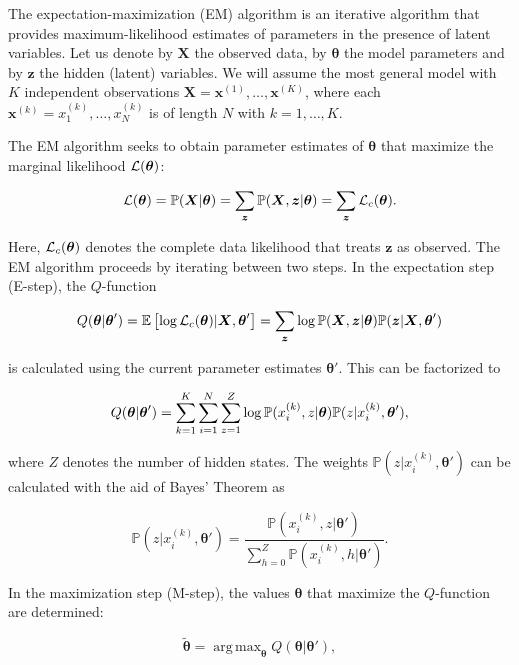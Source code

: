\documentclass[a4paper,11pt]{article}
\def\X{\boldsymbol{X}}
\def\x{\boldsymbol{x}}
\def\z{\boldsymbol{z}}
\def\btheta{\boldsymbol{\theta}}
\DeclareMathOperator*{\argmax}{arg\,max}
\def\L{{\cal L}}
\def\p{\mathbb{P}}
\def\E{\mathbb{E}}
\begin{document}
The expectation-maximization (EM) algorithm is an iterative algorithm that provides maximum-likelihood estimates of parameters in the presence of latent variables. Let us denote by $\X$ the observed data, by $\btheta$ the model parameters and by $\z$ the hidden (latent) variables. We will assume the most general model with $K$ independent observations $\X = \x^{(1)}, \ldots, \x^{(K)}$, where each $\x^{(k)} = x_1^{(k)}, \ldots, x_N^{(k)}$ is of length $N$ with $k = 1, \ldots, K$.

The EM algorithm seeks to obtain parameter estimates of $\btheta$ that maximize the marginal likelihood $\L(\btheta)$:

\begin{equation*}
 \L(\btheta) = \p(\X | \btheta) = \sum_{\z} \p(\X, \z | \btheta) = \sum_{\z} \L_c(\btheta).
\end{equation*}

Here, $\L_c(\btheta)$ denotes the complete data likelihood that treats $\z$ as observed.
The EM algorithm proceeds by iterating between two steps.
In the expectation step (E-step), the $Q$-function

\begin{equation*}
 Q(\btheta | \btheta') = \E \left[ \log \L_c(\btheta) | \X, \btheta' \right] = \sum_{\z} \log \p(\X, \z | \btheta) \p(\z | \X, \btheta')
\end{equation*}

is calculated using the current parameter estimates $\btheta'$. This can be factorized to

\begin{equation}{\label{eq:Q}}
 Q(\btheta | \btheta') = \sum_{k=1}^K \sum_{i=1}^N \sum_{z=1}^Z \log \p(x_i^{(k)}, z | \btheta)  \p(z | x_i^{(k)}, \btheta'),
\end{equation}

where $Z$ denotes the number of hidden states. The weights $\p(z | x_i^{(k)}, \btheta')$ can be calculated with the aid of Bayes' Theorem as

\begin{equation}\label{eq:EM_weights}
\p(z | x_i^{(k)}, \btheta') = \frac{\p(x_i^{(k)}, z | \btheta')}{\sum_{h=0}^Z \p(x_i^{(k)}, h |\btheta')}.
\end{equation}

In the maximization step (M-step), the values $\btheta$ that maximize the $Q$-function are determined:

\begin{equation*}
 \tilde{\btheta} = \argmax_{\btheta} Q(\btheta | \btheta'),
\end{equation*}
\end{document}
